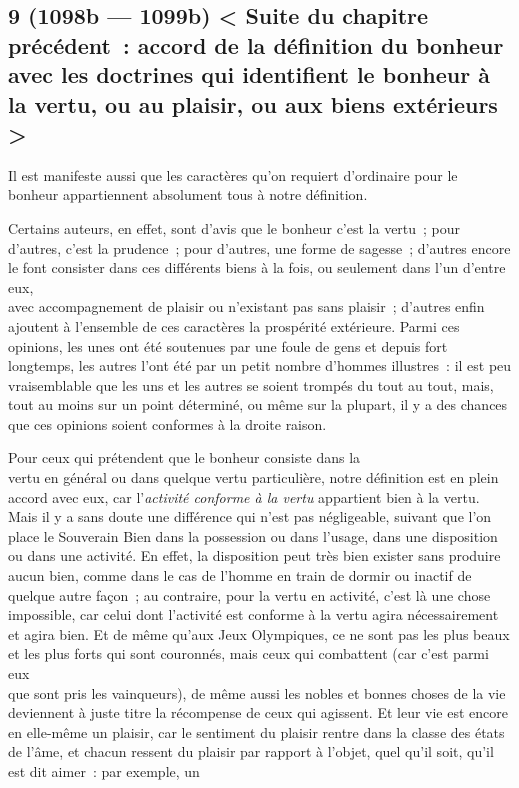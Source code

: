 \documentclass[french,twoside]{book} %
\begin{document}
\subsection[{9 (1098b — 1099b) < Suite du chapitre précédent : accord de la définition du bonheur avec les doctrines qui identifient le bonheur à la vertu, ou au plaisir, ou aux biens extérieurs >}]{9 (1098b — 1099b) < Suite du chapitre précédent : accord de la définition du bonheur avec les doctrines qui identifient le bonheur à la vertu, ou au plaisir, ou aux biens extérieurs >}
\noindent Il est manifeste aussi que les caractères qu’on requiert d’ordinaire pour le bonheur appartiennent absolument tous à notre définition.\par
Certains auteurs, en effet, sont d’avis que le bonheur c’est la vertu ; pour d’autres, c’est la prudence ; pour d’autres, une forme de sagesse ; d’autres encore le font consister dans ces différents biens à la fois, ou seulement dans l’un d’entre eux, \\
avec accompagnement de plaisir ou n’existant pas sans plaisir ; d’autres enfin ajoutent à l’ensemble de ces caractères la prospérité extérieure. Parmi ces opinions, les unes ont été soutenues par une foule de gens et depuis fort longtemps, les autres l’ont été par un petit nombre d’hommes illustres : il est peu vraisemblable que les uns et les autres se soient trompés du tout au tout, mais, tout au moins sur un point déterminé, ou même sur la plupart, il y a des chances que ces opinions soient conformes à la droite raison.\par
Pour ceux qui prétendent que le bonheur consiste dans la \\
vertu en général ou dans quelque vertu particulière, notre définition est en plein accord avec eux, car l’{\itshape activité conforme à la vertu} appartient bien à la vertu. Mais il y a sans doute une différence qui n’est pas négligeable, suivant que l’on place le Souverain Bien dans la possession ou dans l’usage, dans une disposition ou dans une activité. En effet, la disposition peut  très bien exister sans produire aucun bien, comme dans le cas de l’homme en train de dormir ou inactif de quelque autre façon ; au contraire, pour la vertu en activité, c’est là une chose impossible, car celui dont l’activité est conforme à la vertu agira nécessairement et agira bien. Et de même qu’aux Jeux Olympiques, ce ne sont pas les plus beaux et les plus forts qui sont couronnés, mais ceux qui combattent (car c’est parmi eux \\
que sont pris les vainqueurs), de même aussi les nobles et bonnes choses de la vie deviennent à juste titre la récompense de ceux qui agissent. Et leur vie est encore en elle-même un plaisir, car le sentiment du plaisir rentre dans la classe des états de l’âme, et chacun ressent du plaisir par rapport à l’objet, quel qu’il soit, qu’il est dit aimer : par exemple, un \\
\end{document}

